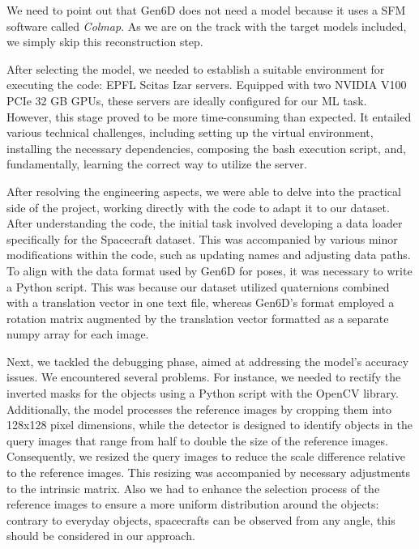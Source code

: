 We need to point out that Gen6D does not need a model because it uses a \ac{SFM} software called \textit{Colmap}. As we are on the track with the target models included, we simply skip this reconstruction step.

\bigbreak 

After selecting the model, we needed to establish a suitable environment for executing the code: EPFL Scitas Izar servers. Equipped with two NVIDIA V100 PCIe 32 GB GPUs, these servers are ideally configured for our \ac{ML} task. However, this stage proved to be more time-consuming than expected. It entailed various technical challenges, including setting up the virtual environment, installing the necessary dependencies, composing the bash execution script, and, fundamentally, learning the correct way to utilize the server.

After resolving the engineering aspects, we were able to delve into the practical side of the project, working directly with the code to adapt it to our dataset. After understanding the code, the initial task involved developing a data loader specifically for the Spacecraft dataset. This was accompanied by various minor modifications within the code, such as updating names and adjusting data paths. To align with the data format used by Gen6D for poses, it was necessary to write a Python script. This was because our dataset utilized quaternions combined with a translation vector in one text file, whereas Gen6D's format employed a rotation matrix augmented by the translation vector formatted as a separate numpy array for each image.


Next, we tackled the debugging phase, aimed at addressing the model's accuracy issues. We encountered several problems. For instance, we needed to rectify the inverted masks for the objects using a Python script with the OpenCV library. Additionally, the model processes the reference images by cropping them into 128x128 pixel dimensions, while the detector is designed to identify objects in the query images that range from half to double the size of the reference images. Consequently, we resized the query images to reduce the scale difference relative to the reference images. This resizing was accompanied by necessary adjustments to the intrinsic matrix. Also we had to enhance the selection process of the reference images to ensure a more uniform distribution around the objects: contrary to everyday objects, spacecrafts can be observed from any angle, this should be considered in our approach.

